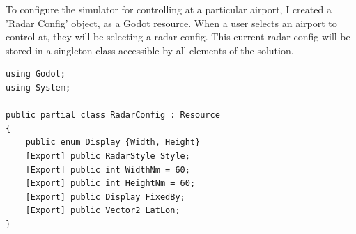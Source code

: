 \documentclass{article}
\begin{document}
To configure the simulator for controlling at a particular airport, I created a 'Radar Config' object, as a Godot resource.
When a user selects an airport to control at, they will be selecting a radar config.
This current radar config will be stored in a singleton class accessible by all elements of the solution.
\lstset{style=csharp}
\begin{lstlisting}[caption=RadarConfig resource]
using Godot;
using System;

public partial class RadarConfig : Resource
{
    public enum Display {Width, Height}
    [Export] public RadarStyle Style;
    [Export] public int WidthNm = 60;
    [Export] public int HeightNm = 60;
    [Export] public Display FixedBy;
    [Export] public Vector2 LatLon;
}
\end{lstlisting}
\end{document}

